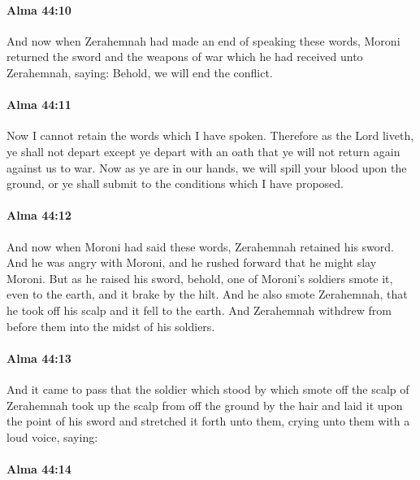 		\paragraph{Alma 44:10} %
			\label{ALMA-44-10}

			And now when Zerahemnah had made an end of speaking these words,
			Moroni returned the sword and the weapons of war which he had received
			unto Zerahemnah, saying:
			Behold, we will end the conflict.

		\paragraph{Alma 44:11} %
			\label{ALMA-44-11}

			Now I cannot retain the words which I have spoken.
			Therefore as the Lord liveth, ye shall not depart
			except ye depart with an oath
			that ye will not return again against us to war.
			Now as ye are in our hands,
			we will spill your blood upon the ground,
			or ye shall submit to the conditions which I have proposed.

		\paragraph{Alma 44:12} %
			\label{ALMA-44-12}

			And now when Moroni had said these words,
			Zerahemnah retained his sword.
			And he was angry with Moroni,
			and he rushed forward that he might slay Moroni.
			But as he raised his sword,
			behold, one of Moroni's soldiers smote it, even to the earth,
			and it brake by the hilt.
			And he also smote Zerahemnah,
			that he took off his scalp and it fell to the earth.
			And Zerahemnah withdrew from before them into the midst of his soldiers.

		\paragraph{Alma 44:13} %
			\label{ALMA-44-13}

			And it came to pass that the soldier which stood by
			which smote off the scalp of Zerahemnah
			took up the scalp from off the ground by the hair
			and laid it upon the point of his sword and stretched it forth unto them,
			crying unto them with a loud voice, saying:

		\paragraph{Alma 44:14} %
			\label{ALMA-44-14}

